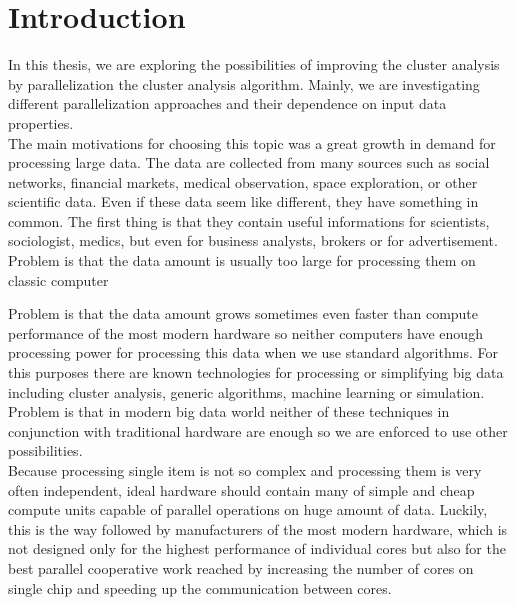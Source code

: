 \pagestyle{plain}
\setcounter{page}{1}

\chapter{Introduction}

In this thesis, we are exploring the possibilities of improving the cluster analysis by parallelization the cluster analysis algorithm. Mainly, we are investigating different parallelization approaches and their dependence on input data properties.\\
The main motivations for choosing this topic was a great growth in demand for processing large data. The data are collected from many sources such as social networks, financial markets, medical observation, space exploration, or other scientific data. Even if these data seem like different, they have something in common. The first thing is that they contain useful informations for scientists, sociologist, medics, but even for business analysts, brokers or for advertisement. %
\\

Problem is that the data amount is usually too large for processing them on classic computer

Problem is that the data amount grows sometimes even faster than compute performance of the most modern hardware so neither computers have enough processing power for processing this data when we use standard algorithms. For this purposes there are known technologies for processing or simplifying big data including cluster analysis, generic algorithms, machine learning or simulation.
Problem is that in modern big data world neither of these techniques in conjunction with traditional hardware are enough so we are enforced to use other possibilities. \\
Because processing single item is not so complex and processing them is very often independent, ideal hardware should contain many of simple and cheap compute units capable of parallel operations on huge amount of data. Luckily, this is the way followed by manufacturers of the most modern hardware, which is not designed only for the highest performance of individual cores but also for the best parallel cooperative work reached by increasing the number of cores on single chip and speeding up the communication between cores. \\


